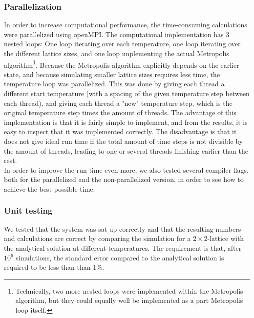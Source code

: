 \documentclass[10pt,a4paper]{article}
\begin{document}
\subsubsection{Parallelization}
In order to increase computational performance, the time-consuming calculations were parallelized using openMPI. The computational implementation has 3 nested loops: One loop iterating over each temperature, one loop iterating over the different lattice sizes, and one loop implementing the actual Metropolis algorithm\footnote{Technically, two more nested loops were implemented within the Metropolis algorithm, but they could equally well be implemented as a part Metropolis loop itself.}. Because the Metropolis algorithm explicitly depends on the earlier state, and because simulating smaller lattice sizes requires less time, the temperature loop was parallelized. This was done by giving each thread a different start temperature (with a spacing of the given temperature step between each thread), and giving each thread a "new" temperature step, which is the original temperature step times the amount of threads. The advantage of this implementation is that it is fairly simple to implement, and from the results, it is easy to inspect that it was implemented correctly. The disadvantage is that it does not give ideal run time if the total amount of time steps is not divisible by the amount of threads, leading to one or several threads finishing earlier than the rest. \\
In order to improve the run time even more, we also tested several compiler flags, both for the parallelized and the non-parallelized version, in order to see how to achieve the best possible time.
\subsubsection{Unit testing}
We tested that the system was sat up correctly and that the resulting numbers and calculations are correct  by comparing the simulation for a $2\times2$-lattice with the analytical solution at different temperatures. The requirement is that, after $10^6$ simulations, the standard error compared to the analytical solution is required to be less than than 1\%.
\end{document}
